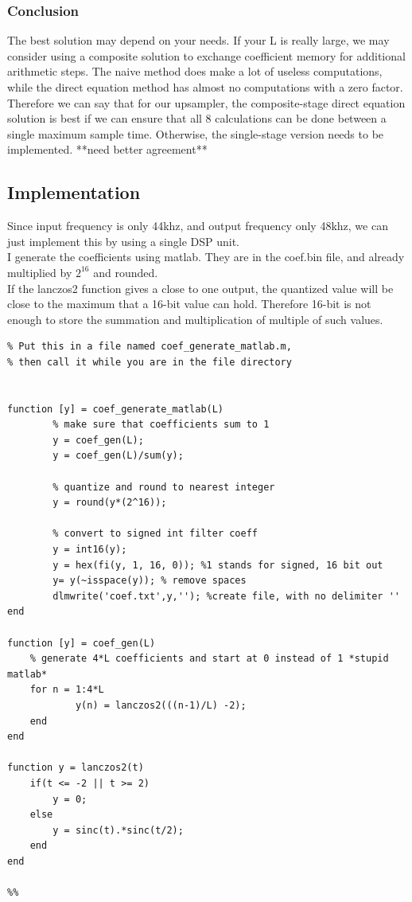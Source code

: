 \documentclass[a4paper,twoside,11pt, fleqn]{article}
\begin{document}
\subsubsection{Conclusion}
The best solution may depend on your needs. If your L is really large, we may consider using a composite solution to exchange coefficient memory for additional arithmetic steps. The naive method does make a lot of useless computations, while the direct equation method has almost no computations with a zero factor.\\

Therefore we can say that for our upsampler, the composite-stage direct equation solution is best if we can ensure that all 8 calculations can be done between a single maximum sample time. Otherwise, the single-stage version needs to be implemented. **need better agreement**

\newpage
\subsection{Implementation}
Since input frequency is only 44khz, and output frequency only 48khz, we can just implement this by using a single DSP unit.\\

I generate the coefficients using matlab. They are in the coef.bin file, and already multiplied by $2^{16}$ and rounded.\\

If the lanczos2 function gives a close to one output, the quantized value will be close to the maximum that a 16-bit value can hold. Therefore 16-bit is not enough to store the summation and multiplication of multiple of such values.\\

\begin{lstlisting}
% Put this in a file named coef_generate_matlab.m, 
% then call it while you are in the file directory


function [y] = coef_generate_matlab(L)
        % make sure that coefficients sum to 1
        y = coef_gen(L);
        y = coef_gen(L)/sum(y);

        % quantize and round to nearest integer
        y = round(y*(2^16)); 
             
        % convert to signed int filter coeff
        y = int16(y);
        y = hex(fi(y, 1, 16, 0)); %1 stands for signed, 16 bit out
        y= y(~isspace(y)); % remove spaces
        dlmwrite('coef.txt',y,''); %create file, with no delimiter ''      
end

function [y] = coef_gen(L)
    % generate 4*L coefficients and start at 0 instead of 1 *stupid matlab*
    for n = 1:4*L
            y(n) = lanczos2(((n-1)/L) -2);
    end
end

function y = lanczos2(t)
    if(t <= -2 || t >= 2)
        y = 0;
    else
        y = sinc(t).*sinc(t/2);
    end
end

%%



\end{lstlisting}
\end{document}
